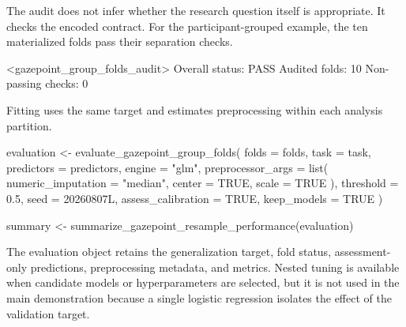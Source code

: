 \documentclass[article]{jss}
\begin{document}

The audit does not infer whether the research question itself is appropriate. It checks
the encoded contract. For the participant-grouped example, the ten materialized folds
pass their separation checks.

\begin{CodeOutput}
<gazepoint_group_folds_audit>
Overall status: PASS
Audited folds: 10
Non-passing checks: 0
\end{CodeOutput}

Fitting uses the same target and estimates preprocessing within each analysis
partition.

\begin{CodeInput}
evaluation <- evaluate_gazepoint_group_folds(
  folds = folds, task = task, predictors = predictors,
  engine = "glm",
  preprocessor_args = list(
    numeric_imputation = "median",
    center = TRUE, scale = TRUE
  ),
  threshold = 0.5, seed = 20260807L,
  assess_calibration = TRUE, keep_models = TRUE
)

summary <- summarize_gazepoint_resample_performance(evaluation)
\end{CodeInput}

The evaluation object retains the generalization target, fold status, assessment-only
predictions, preprocessing metadata, and metrics. Nested tuning is available when
candidate models or hyperparameters are selected, but it is not used in the main
demonstration because a single logistic regression isolates the effect of the
validation target.
\end{document}
